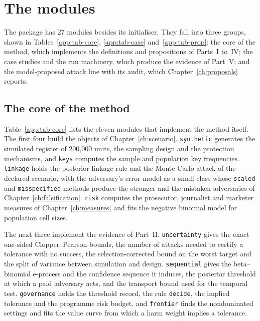 \section{The modules}

The package has 27 modules besides its initialiser. %
They fall into three groups, shown in Tables~\ref{app:tab-core}, \ref{app:tab-case}
and~\ref{app:tab-prop}: the core of the method, which implements the definitions and
propositions of Parts~I to~IV; the case studies and the run machinery, which produce
the evidence of Part~V; and the model-proposed attack line with its audit, which
Chapter~\ref{ch:proposals} reports.

\subsection*{The core of the method}

Table~\ref{app:tab-core} lists the eleven modules that implement the method itself.
The first four build the objects of Chapter~\ref{ch:scenario}. \texttt{synthetic}
generates the simulated register of 200{,}000 units, the sampling design and the
protection mechanisms, and \texttt{keys} computes the sample and population key
frequencies. \texttt{linkage} holds the posterior linkage rule and the Monte Carlo
attack of the declared scenario, with the adversary's error model as a small class
whose \texttt{scaled} and \texttt{misspecified} methods produce the stronger and the
mistaken adversaries of Chapter~\ref{ch:falsification}. \texttt{risk} computes the
prosecutor, journalist and marketer measures of Chapter~\ref{ch:measures} and fits the
negative binomial model for population cell sizes.

The next three implement the evidence of Part~II. \texttt{uncertainty} gives the exact
one-sided Clopper--Pearson bounds, the number of attacks needed to certify a tolerance
with no success, the selection-corrected bound on the worst target and the split of
variance between simulation and design. \texttt{sequential} gives the beta--binomial
e-process and the confidence sequence it induces, the posterior threshold at which a
paid adversary acts, and the transport bound used for the temporal test.
\texttt{governance} holds the threshold record, the rule \texttt{decide}, the implied
tolerance and the programme risk budget, and \texttt{frontier} finds the nondominated
settings and fits the value curve from which a harm weight implies a tolerance.

